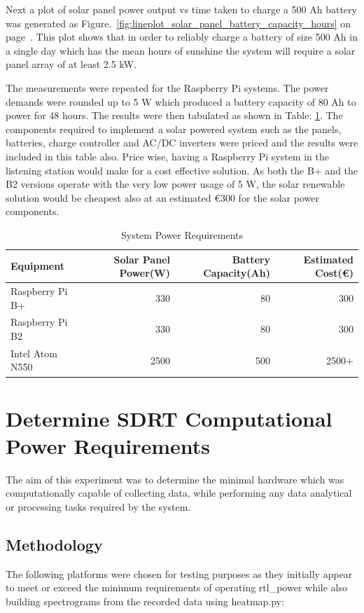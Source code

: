 Next a plot of solar panel power output vs time taken to charge a 500 Ah battery was generated as Figure.~\ref{fig:lineplot_solar_panel_battery_capacity_hours} on page~\pageref{fig:lineplot_solar_panel_battery_capacity_hours}. This plot shows that in order to reliably charge a battery of size 500 Ah in a single day which has the mean hours of sunshine the system will require a solar panel array of at least 2.5 kW.

The measurements were repeated for the Raspberry Pi systems. The power demands were rounded up to 5 W which produced a battery capacity of 80 Ah to power for 48 hours. The results were then tabulated as shown in Table: \ref{tab:system_power_requirements}. The components required to implement a solar powered system such as the panels, batteries, charge controller and AC/DC inverters were priced and the results were included in this table also. Price wise, having a Raspberry Pi system in the listening station would make for a cost effective solution. As both the B+ and the B2 versions operate with the very low power usage of 5 W, the solar renewable solution would be cheapest also at an estimated \euro 300 for the solar power components.

%
\begin{table}
	\centering
	\begin{tabular}{l r r r}
		\toprule
		Equipment & Solar Panel Power(W) & Battery Capacity(Ah) & Estimated Cost(\euro)\\ \midrule
		Raspberry Pi B+ & 330 & 80 & 300 \\
		Raspberry Pi B2 & 330 & 80 & 300 \\
		Intel Atom N550 & 2500 & 500 & 2500+ \\
		\bottomrule
	\end{tabular}
	\caption{System Power Requirements}
	\label{tab:system_power_requirements}
\end{table}
%


\section*{Determine SDRT Computational Power Requirements}
The aim of this experiment was to determine the minimal hardware which was computationally capable of collecting data, while  performing any data analytical or processing tasks required by the system.


\subsection*{Methodology}
The following platforms were chosen for testing purposes as they initially appear to meet or exceed the minimum requirements of operating rtl\_power while also building spectrograms from the recorded data using heatmap.py:

